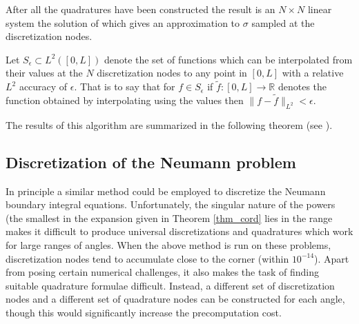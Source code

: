 After all the quadratures have been constructed the result is an $N \times N$ linear system the  solution of which gives an approximation to $\sigma$ sampled at the discretization nodes. 

\begin{definition}\label{def:seps}
Let $S_\epsilon \subset L^2([0,L])$ denote the set of functions which can be interpolated from their values at the $N$ discretization nodes to any point in $[0,L]$ with a relative $L^2$ accuracy of $\epsilon.$ That is to say that for $f \in S_\epsilon$ if $\tilde{f}:[0,L] \to \mathbb{R}$ denotes the function obtained by interpolating using the values  then $\|f -\tilde{f}\|_{L^2} < \epsilon.$ 
\end{definition}

The results of this algorithm are summarized in the following theorem (see \cite{hoskins2019numerical}).


\subsection{Discretization of the Neumann problem}
In principle a similar method could be employed to discretize the Neumann boundary integral equations. Unfortunately, the singular nature of the powers (the smallest in the expansion given in Theorem \ref{thm_cord} lies in the range  makes it difficult to produce universal discretizations and quadratures which work for large ranges of angles. When the above method is run on these problems, discretization nodes tend to accumulate close to the corner (within $10^{-14}$). Apart from posing certain numerical challenges, it also makes the task of finding suitable quadrature formulae difficult. Instead, a different set of discretization nodes and a different set of quadrature nodes can be constructed for each angle, though this would significantly increase the precomputation cost.

